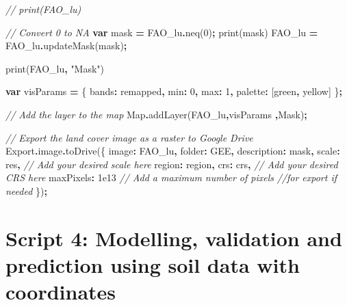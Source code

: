 \documentclass[
  10pt,
  b5paper,
  oneside]{book}
\newenvironment{Shaded}{\begin{snugshade}}{\end{snugshade}}
\newcommand{\AttributeTok}[1]{\textcolor[rgb]{0.77,0.63,0.00}{#1}}
\newcommand{\BuiltInTok}[1]{#1}
\newcommand{\CommentTok}[1]{\textcolor[rgb]{0.56,0.35,0.01}{\textit{#1}}}
\newcommand{\DataTypeTok}[1]{\textcolor[rgb]{0.13,0.29,0.53}{#1}}
\newcommand{\DecValTok}[1]{\textcolor[rgb]{0.00,0.00,0.81}{#1}}
\newcommand{\FloatTok}[1]{\textcolor[rgb]{0.00,0.00,0.81}{#1}}
\newcommand{\FunctionTok}[1]{\textcolor[rgb]{0.00,0.00,0.00}{#1}}
\newcommand{\KeywordTok}[1]{\textcolor[rgb]{0.13,0.29,0.53}{\textbf{#1}}}
\newcommand{\NormalTok}[1]{#1}
\newcommand{\OperatorTok}[1]{\textcolor[rgb]{0.81,0.36,0.00}{\textbf{#1}}}
\newcommand{\StringTok}[1]{\textcolor[rgb]{0.31,0.60,0.02}{#1}}
\begin{document}
\begin{Shaded}
\begin{Highlighting}[]
\CommentTok{// print(FAO\_lu)}

\CommentTok{// Convert 0 to NA}
\KeywordTok{var}\NormalTok{ mask }\OperatorTok{=}\NormalTok{ FAO\_lu}\OperatorTok{.}\FunctionTok{neq}\NormalTok{(}\DecValTok{0}\NormalTok{)}\OperatorTok{;}
\FunctionTok{print}\NormalTok{(mask)}
\NormalTok{FAO\_lu }\OperatorTok{=}\NormalTok{ FAO\_lu}\OperatorTok{.}\FunctionTok{updateMask}\NormalTok{(mask)}\OperatorTok{;}

\FunctionTok{print}\NormalTok{(FAO\_lu}\OperatorTok{,} \StringTok{"Mask"}\NormalTok{)}

\KeywordTok{var}\NormalTok{ visParams }\OperatorTok{=}\NormalTok{ \{}
  \DataTypeTok{bands}\OperatorTok{:} \StringTok{\textquotesingle{}remapped\textquotesingle{}}\OperatorTok{,}
  \DataTypeTok{min}\OperatorTok{:} \DecValTok{0}\OperatorTok{,}
  \DataTypeTok{max}\OperatorTok{:} \DecValTok{1}\OperatorTok{,}
  \DataTypeTok{palette}\OperatorTok{:}\NormalTok{ [}\StringTok{\textquotesingle{}green\textquotesingle{}}\OperatorTok{,} \StringTok{\textquotesingle{}yellow\textquotesingle{}}\NormalTok{]}
\NormalTok{\}}\OperatorTok{;}

\CommentTok{// Add the layer to the map}
\BuiltInTok{Map}\OperatorTok{.}\FunctionTok{addLayer}\NormalTok{(FAO\_lu}\OperatorTok{,}\NormalTok{visParams }\OperatorTok{,}\StringTok{\textquotesingle{}Mask\textquotesingle{}}\NormalTok{)}\OperatorTok{;}

\CommentTok{// Export the land cover image as a raster to Google Drive}
\NormalTok{Export}\OperatorTok{.}\AttributeTok{image}\OperatorTok{.}\FunctionTok{toDrive}\NormalTok{(\{}
  \DataTypeTok{image}\OperatorTok{:}\NormalTok{ FAO\_lu}\OperatorTok{,}
  \DataTypeTok{folder}\OperatorTok{:} \StringTok{\textquotesingle{}GEE\textquotesingle{}}\OperatorTok{,}
  \DataTypeTok{description}\OperatorTok{:} \StringTok{\textquotesingle{}mask\textquotesingle{}}\OperatorTok{,}
  \DataTypeTok{scale}\OperatorTok{:}\NormalTok{ res}\OperatorTok{,} \CommentTok{// Add your desired scale here}
  \DataTypeTok{region}\OperatorTok{:}\NormalTok{ region}\OperatorTok{,}
  \DataTypeTok{crs}\OperatorTok{:}\NormalTok{ crs}\OperatorTok{,} \CommentTok{// Add your desired CRS here}
  \DataTypeTok{maxPixels}\OperatorTok{:} \FloatTok{1e13} \CommentTok{// Add a maximum number of pixels }
  \CommentTok{//for export if needed}
\NormalTok{\})}\OperatorTok{;}
\end{Highlighting}
\end{Shaded}

\hypertarget{script-4-modelling-validation-and-prediction-using-soil-data-with-coordinates}{%
\section*{Script 4: Modelling, validation and prediction using soil data with coordinates}\label{script-4-modelling-validation-and-prediction-using-soil-data-with-coordinates}}
\end{document}
